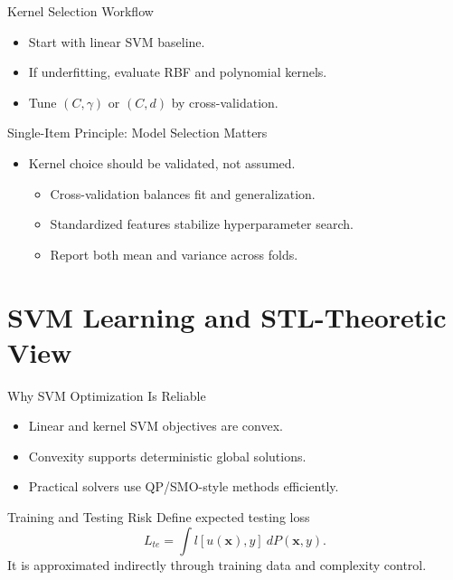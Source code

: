 \documentclass[10pt]{beamer}
\begin{document}
\begin{frame}{Kernel Selection Workflow}
  \justifying
  \begin{itemize}
    \item Start with linear SVM baseline.
    \item If underfitting, evaluate RBF and polynomial kernels.
    \item Tune $(C,\gamma)$ or $(C,d)$ by cross-validation.
  \end{itemize}
\end{frame}

\begin{frame}{Single-Item Principle: Model Selection Matters}
  \justifying
  \begin{itemize}
    \item Kernel choice should be validated, not assumed.
    \begin{itemize}
      \item Cross-validation balances fit and generalization.
      \item Standardized features stabilize hyperparameter search.
      \item Report both mean and variance across folds.
    \end{itemize}
  \end{itemize}
\end{frame}

\section{SVM Learning and STL-Theoretic View}

\begin{frame}{Why SVM Optimization Is Reliable}
  \justifying
  \begin{itemize}
    \item Linear and kernel SVM objectives are convex.
    \item Convexity supports deterministic global solutions.
    \item Practical solvers use QP/SMO-style methods efficiently.
  \end{itemize}
\end{frame}

\begin{frame}{Training and Testing Risk}
  \justifying
  Define expected testing loss
  \[
    L_{te} = \int l[u(\bm{x}),y] \ dP(\bm{x},y).
  \]
  It is approximated indirectly through training data and complexity control.
\end{frame}
\end{document}
